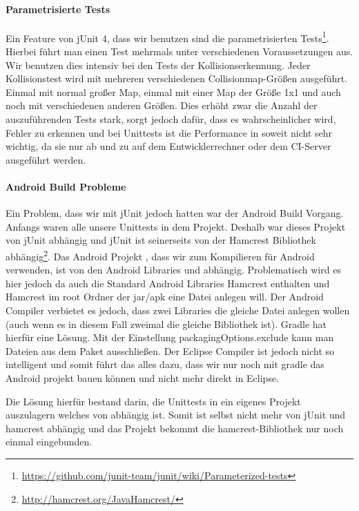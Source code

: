 \paragraph{Parametrisierte Tests}

Ein Feature von jUnit 4, dass wir benutzen sind die parametrisierten Tests\footnote{\url{https://github.com/junit-team/junit/wiki/Parameterized-tests}}. 
Hierbei führt man einen Test mehrmals unter verschiedenen Voraussetzungen aus. 
Wir benutzen dies intensiv bei den Tests der Kollisionserkennung. 
Jeder Kollisionstest wird mit mehreren verschiedenen Collisionmap-Größen ausgeführt. 
Einmal mit normal großer Map, einmal mit einer Map der Größe 1x1 und auch noch mit verschiedenen anderen Größen. 
Dies erhöht zwar die Anzahl der auszuführenden Tests stark, sorgt jedoch dafür, dass es wahrscheinlicher wird, Fehler zu erkennen und bei Unittests ist die Performance in soweit nicht sehr wichtig, da sie nur ab und zu auf dem Entwicklerrechner oder dem CI-Server ausgeführt werden.

\paragraph{Android Build Probleme}

Ein Problem, dass wir mit jUnit jedoch hatten war der Android Build Vorgang. 
Anfangs waren alle unsere Unittests in dem  Projekt. Deshalb war dieses Projekt von jUnit abhängig und jUnit ist seinerseits von der Hamcrest Bibliothek abhängig\footnote{\url{http://hamcrest.org/JavaHamcrest/}}. 
Das Android Projekt , dass wir zum Kompilieren für Android verwenden, ist von den Android Libraries und  abhängig.
Problematisch wird es hier jedoch da auch die Standard Android Libraries Hamcrest enthalten und Hamcrest im root Ordner der jar/apk eine Datei  anlegen will. Der Android Compiler verbietet es jedoch, dass zwei Libraries die gleiche Datei anlegen wollen (auch wenn es in diesem Fall zweimal die gleiche Bibliothek ist).
Gradle hat hierfür eine Lösung. Mit der Einstellung packagingOptions.exclude kann man Dateien aus dem Paket ausschließen. Der Eclipse Compiler ist jedoch nicht so intelligent und somit führt das alles dazu, dass wir nur noch mit gradle das Android projekt bauen können und nicht mehr direkt in Eclipse.

Die Lösung hierfür bestand darin, die Unittests in ein eigenes Projekt  auszulagern welches von  abhängig ist. Somit ist  selbst nicht mehr von jUnit und hamcrest abhängig und das Projekt  bekommt die hamcrest-Bibliothek nur noch einmal eingebunden.